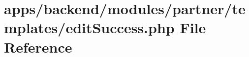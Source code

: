 \hypertarget{backend_2modules_2partner_2templates_2edit_success_8php}{\section{apps/backend/modules/partner/templates/edit\-Success.php File Reference}
\label{backend_2modules_2partner_2templates_2edit_success_8php}
}
